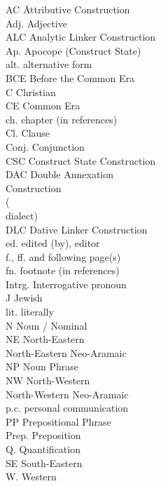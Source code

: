 

\begin{multicols}{2}
\begin{tabbing}
AC \hspace{6ex} \= Attributive Construction \\
Adj. \> Adjective \\
ALC \> Analytic Linker Construction \\
Ap. \> Apocope (Construct State) \\
alt. \> alternative form \\
BCE \> Before the Common Era \\
C \> Christian \\
CE \> Common Era \\ 
ch. \> chapter (in references) \\
Cl. \> Clause \\
Conj. \> Conjunction \\
CSC \> Construct State Construction \\
DAC \> Double Annexation \\ \> Construction \\
\DiyZ \> \Diy ( \\ \> dialect) \\
DLC \> Dative Linker Construction \\
ed. \> edited (by), editor \\
f., ff. \> and following page(s) \\
fn. \> footnote (in references)\\
Intrg. \> Interrogative pronoun \\
J \> Jewish \\
lit. \> literally \\
N \> Noun / Nominal \\
NE \> North-Eastern \\
 \> North-Eastern Neo-Aramaic \\
NP \> Noun Phrase \\
NW \> North-Western \\
 \> North-Western Neo-Aramaic \\
p.c. \> personal communication \\ 
PP \> Prepositional Phrase \\
Prep. \> Preposition \\
Q. \> Quantification \\
SE \> South-Eastern \\
W. \> Western \\
\end{tabbing}
\end{multicols}


